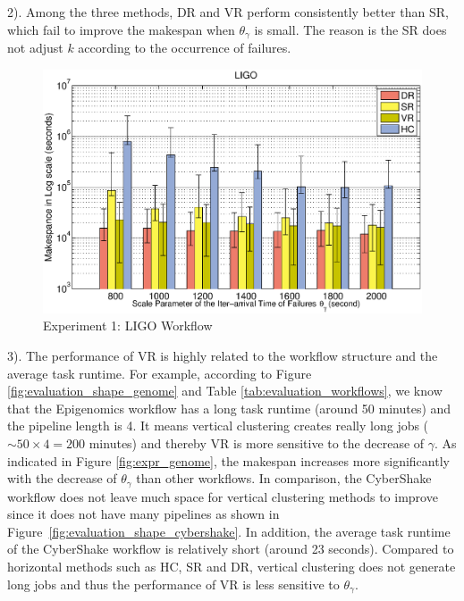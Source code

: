 \documentclass{IOS-Book-Article}
\begin{document}
2). Among the three methods, DR and VR perform consistently better than SR, which fail to improve the makespan when $\theta_{\gamma}$ is small. The reason is the SR does not adjust $k$ according to the occurrence of failures. 

\begin{figure}[!htb]
\centering
  \includegraphics[width=1\linewidth]{ligo.eps}
  \caption{Experiment 1: LIGO Workflow}
  \label{fig:expr_ligo}
\end{figure}

3). The performance of VR is highly related to the workflow structure and the average task runtime. For example, according to Figure \ref{fig:evaluation_shape_genome} and Table \ref{tab:evaluation_workflows}, we know that the Epigenomics workflow has a long task runtime (around 50 minutes) and the pipeline length is 4. It means vertical clustering creates really long jobs ($\sim 50\times 4=200$ minutes) and thereby VR is more sensitive to the decrease of $\gamma$. As indicated in Figure \ref{fig:expr_genome}, the makespan increases more significantly with the decrease of $\theta_{\gamma}$ than other workflows. In comparison, the CyberShake workflow does not leave much space for vertical clustering methods to improve since it does not have many pipelines as shown in Figure~\ref{fig:evaluation_shape_cybershake}. In addition, the average task runtime of the CyberShake workflow is relatively short (around 23 seconds). Compared to horizontal methods such as HC, SR and DR, vertical clustering does not generate long jobs and thus the performance of VR is less  sensitive to $\theta_{\gamma}$. 

\end{document}
